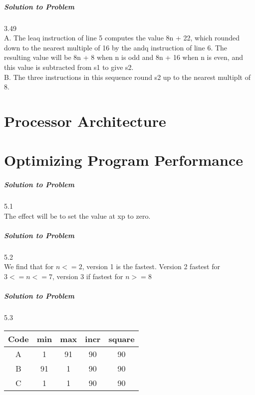 \documentclass{report}
\begin{document}
\paragraph{Solution to Problem } 3.49\\
A. The leaq instruction of line 5 computes the value 8n + 22, which rounded down to the nearest multiple of 16 by the andq instruction of line 6. The resulting value will be 8n + 8 when n is odd and 8n + 16 when n is even, and this value is subtracted from s1 to give s2. \\
B. The three instructions in this sequence round s2 up to the nearest multiplt of 8. \\

\chapter{Processor Architecture}

\chapter{Optimizing Program Performance}
\paragraph{Solution to Problem } 5.1\\
The effect will be to set the value at xp to zero.

\paragraph{Solution to Problem } 5.2\\
We find that for $n<=2$, version 1 is the fastest. Version 2 fastest for $3<= n <= 7$,
version 3 if fastest for $n >= 8$

\paragraph{Solution to Problem } 5.3\\
\begin{center}
\begin{tabular}{ |c|c|c|c|c| } 
\hline
Code & min & max & incr & square \\ \hline
A & 1 & 91 & 90 & 90 \\
B & 91 & 1 & 90 & 90 \\
C & 1 & 1 & 90 & 90 \\
\hline
\end{tabular}
\end{center}
\end{document}
